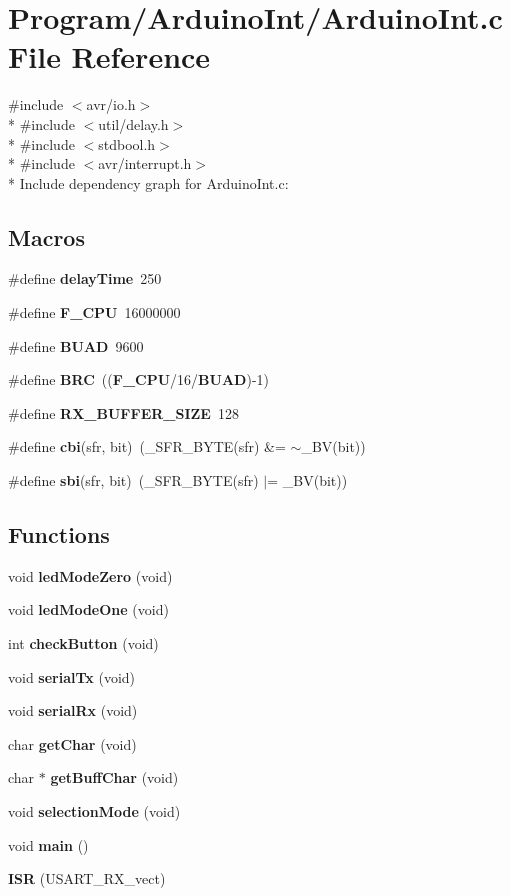 \section{Program/\-Arduino\-Int/\-Arduino\-Int.c File Reference}
\label{_arduino_int_8c}
{\ttfamily \#include $<$avr/io.\-h$>$}\\*
{\ttfamily \#include $<$util/delay.\-h$>$}\\*
{\ttfamily \#include $<$stdbool.\-h$>$}\\*
{\ttfamily \#include $<$avr/interrupt.\-h$>$}\\*
Include dependency graph for Arduino\-Int.\-c\-:
\subsection*{Macros}
\begin{DoxyCompactItemize}
\item 
\#define {\bf delay\-Time}~250
\item 
\#define {\bf F\-\_\-\-C\-P\-U}~16000000
\item 
\#define {\bf B\-U\-A\-D}~9600
\item 
\#define {\bf B\-R\-C}~(({\bf F\-\_\-\-C\-P\-U}/16/{\bf B\-U\-A\-D})-\/1)
\item 
\#define {\bf R\-X\-\_\-\-B\-U\-F\-F\-E\-R\-\_\-\-S\-I\-Z\-E}~128
\item 
\#define {\bf cbi}(sfr, bit)~(\-\_\-\-S\-F\-R\-\_\-\-B\-Y\-T\-E(sfr) \&= $\sim$\-\_\-\-B\-V(bit))
\item 
\#define {\bf sbi}(sfr, bit)~(\-\_\-\-S\-F\-R\-\_\-\-B\-Y\-T\-E(sfr) $\vert$= \-\_\-\-B\-V(bit))
\end{DoxyCompactItemize}
\subsection*{Functions}
\begin{DoxyCompactItemize}
\item 
void {\bf led\-Mode\-Zero} (void)
\item 
void {\bf led\-Mode\-One} (void)
\item 
int {\bf check\-Button} (void)
\item 
void {\bf serial\-Tx} (void)
\item 
void {\bf serial\-Rx} (void)
\item 
char {\bf get\-Char} (void)
\item 
char $\ast$ {\bf get\-Buff\-Char} (void)
\item 
void {\bf selection\-Mode} (void)
\item 
void {\bf main} ()
\item 
{\bf I\-S\-R} (U\-S\-A\-R\-T\-\_\-\-R\-X\-\_\-vect)
\end{DoxyCompactItemize}
